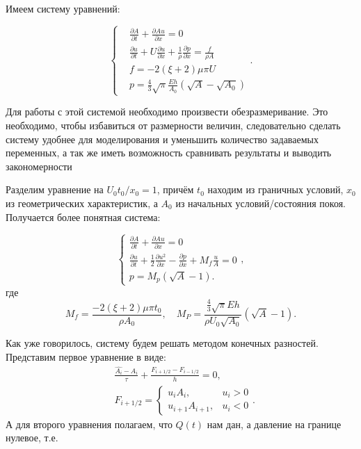 Имеем систему уравнений:

\begin{equation*}
    \label{sys_of_eq}
    \begin{cases}
        &\frac{\partial A}{\partial t}+\frac{\partial Au}{\partial x}=0\\
        &\frac{\partial u}{\partial t}+U\frac{\partial u}{\partial x}+\frac{1}{\rho}\frac{\partial p}{\partial x}=\frac{f}{\rho A}\\
        &f=-2(\xi+2)\mu\pi U\\
        &p=\frac{4}{3}\sqrt{\pi}\frac{Eh}{A_0}(\sqrt{A}-\sqrt{A_0})
    \end{cases}.
\end{equation*}

Для работы с этой системой необходимо произвести обезразмеривание. Это необходимо, чтобы избавиться от размерности величин,
следовательно сделать систему удобнее для моделирования и уменьшить количество задаваемых переменных, 
а так же иметь возможность сравнивать результаты и выводить закономерности

Разделим уравнение на ${U_0 t_0}/{x_0}=1$,  причём $t_0$ находим из граничных условий, 
$x_0$ из геометрических характеристик, а $A_0$ из начальных условий/состояния покоя. Получается более понятная система:

\begin{equation}
    \label{sys_of_eq1}
    \begin{cases}
        \frac{\partial A}{\partial t}+\frac{\partial Au}{\partial x}=0\\
        \frac{\partial u}{\partial t}+\frac{1}{2}\frac{\partial u^2}{\partial x}-\frac{\partial p}{\partial x}+M_f \frac{u}{A}=0\\
        p=M_p(\sqrt{A}-1).
    \end{cases},
    \end{equation}
где 
$$ M_f=\frac{-2(\xi+2)\mu \pi t_0}{\rho A_0},\quad  M_P=\frac{\frac{4}{3}\sqrt{\pi}Eh}{\rho U_0\sqrt{A_0}}(\sqrt{A}-1).$$



Как уже говорилось, систему будем решать методом конечных разностей. Представим первое уравнение в виде:
$$
\begin{aligned}
    &\frac{\hat{A_i}-A_i}{\tau}+\frac{F_{i+1/2}-F_{i-1/2}}{h}=0,\\
    &F_{i+1/2}=\begin{cases}
        u_i A_i, &u_i>0\\
        u_{i+1}A_{i+1},& u_i<0
    \end{cases}.
\end{aligned}
$$
А для второго уравнения полагаем, что $Q(t)$ нам дан, а давление на границе нулевое, т.е. 

